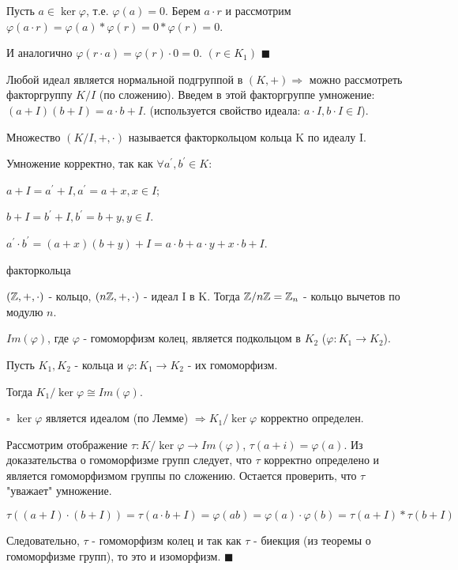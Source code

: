 \documentclass[../main.tex]{subfiles}
\begin{document}
    Пусть $a\in \ker{\varphi}$, т.е. $\varphi(a) = 0$. Берем $a\cdot r$ и рассмотрим
    $\varphi(a\cdot r) = \varphi(a) * \varphi(r) = 0 * \varphi(r) = 0$.

    И аналогично $\varphi(r\cdot a) = \varphi(r)\cdot 0 = 0$. $(r\in K_1)$ $\blacksquare$

    \void{} Любой идеал является нормальной подгруппой в $(K, +) \Longrightarrow$
    можно рассмотреть факторгруппу $K/I$ (по сложению). Введем в этой факторгруппе умножение:
    $(a + I)(b + I) = a\cdot b + I$. (используется свойство идеала: $a\cdot I, b\cdot I\in I$).

    \void{} Множество $(K/I, +, \cdot)$ называется факторкольцом кольца K по идеалу I.

    \void{} Умножение корректно, так как $\forall a^{'}, b^{'}\in K$:

    $a + I = a^{'} + I, a^{'} = a + x, x\in I$;

    $b + I = b^{'} + I, b^{'} = b + y, y\in I$.

    $a^{'}\cdot b^{'} = (a + x)(b + y) + I = a\cdot b + a\cdot y + x\cdot b + I$.

    \void{} факторкольца

    $(\mathbb{Z}, +, \cdot)$ - кольцо, $(n\mathbb{Z}, +, \cdot)$ - идеал I в K. Тогда
    $\mathbb{Z}/n\mathbb{Z} = \mathbb{Z}_n$ - кольцо вычетов по модулю $n$.

    \void{} $Im(\varphi)$, где $\varphi$ - гомоморфизм колец, является подкольцом
    в $K_2$ ($\varphi: K_1\rightarrow K_2$).

    \void{}

    Пусть $K_1, K_2$ - кольца и $\varphi: K_1\rightarrow K_2$ - их гомоморфизм.

    Тогда $K_1/\ker{\varphi} \cong Im(\varphi)$.

    \void
    $\square$ $\ker{\varphi}$ является идеалом (по Лемме) $\Rightarrow K_1/\ker{\varphi}$
    корректно определен.

    Рассмотрим отображение $\tau: K/\ker{\varphi}\rightarrow Im(\varphi)$,
    $\tau(a + i) = \varphi(a)$. Из доказательства о гомоморфизме групп следует, что $\tau$
    корректно определено и является гомоморфизмом группы по сложению. Остается проверить, что
    $\tau$ "уважает" умножение.

    $$\tau((a+I)\cdot(b+I)) = \tau(a\cdot b+I) = \varphi(ab) = \varphi(a)\cdot\varphi(b) =
    \tau(a+I) * \tau(b+I)$$

    Следовательно, $\tau$ - гомоморфизм колец и так как $\tau$ - биекция (из теоремы о гомоморфизме
    групп), то это и изоморфизм. $\blacksquare$
\end{document}
